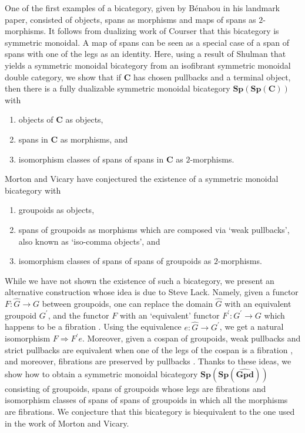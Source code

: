 \documentclass[11pt]{amsart}
\newcommand{\cat}[1]{\mathbf{#1}}
\theoremstyle{remark}
\theoremstyle{definition}
\begin{document}
One of the first examples of a bicategory, given by B\'enabou \cite{Be} in his landmark paper, consisted of objects, spans as morphisms and maps of spans as $2$-morphisms. It follows from dualizing work of Courser \cite{Cour} that this bicategory is symmetric monoidal. A map of spans can be seen as a special case of a span of spans with one of the legs as an identity. Here, using a result of Shulman \cite{Shul} that yields a symmetric monoidal bicategory from an isofibrant symmetric monoidal double category, we show that if $\cat{C}$ has chosen pullbacks and a terminal object, then there is a fully dualizable symmetric monoidal bicategory $\cat{Sp(Sp(C))}$ with
\begin{enumerate}
\item{objects of $\cat{C}$ as objects,}
\item{spans in $\cat{C}$ as morphisms, and}
\item{isomorphism classes of spans of spans in $\cat{C}$ as $2$-morphisms.}
\end{enumerate}

Morton and Vicary \cite{MortVic} have conjectured the existence of a symmetric monoidal bicategory with
\begin{enumerate}
\item{groupoids as objects,}
\item{spans of groupoids as morphisms which are composed via `weak pullbacks', also known as `iso-comma objects', and}
\item{isomorphism classes of spans of spans of groupoids as $2$-morphisms.}
\end{enumerate}
While we have not shown the existence of such a bicategory, we present an alternative construction whose idea is due to Steve Lack. Namely, given a functor $F \colon \hat{G} \to G$ between groupoids, one can replace the domain $\hat{G}$ with an equivalent groupoid $G^\prime$, and the functor $F$ with an `equivalent' functor $F^\prime \colon G^\prime \to G$ which happens to be a fibration \cite{Anderson,Bousfield,Strickland}. Using the equivalence $e \colon \hat{G} \to G^\prime$, we get a natural isomorphism $F \Rightarrow F^\prime e$. Moreover, given a cospan of groupoids, weak pullbacks and strict pullbacks are equivalent when one of the legs of the cospan is a fibration \cite{JoyalStreet1}, and moreover, fibrations are preserved by pullbacks \cite{Brown,Heath}. Thanks to these ideas, we show how to obtain a symmetric monoidal bicategory $\cat{Sp(Sp(\widehat{Gpd}))}$ consisting of groupoids, spans of groupoids whose legs are fibrations and isomorphism classes of spans of spans of groupoids in which all the morphisms are fibrations. We conjecture that this bicategory is biequivalent to the one used in the work of Morton and Vicary.
\end{document}
